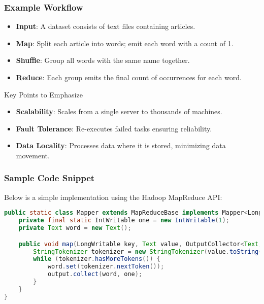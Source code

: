 \documentclass[aspectratio=169]{beamer}
\begin{document}
\begin{frame}
    \frametitle{Example Workflow}
    \begin{itemize}
        \item \textbf{Input}: A dataset consists of text files containing articles.
        \item \textbf{Map}: Split each article into words; emit each word with a count of 1.
        \item \textbf{Shuffle}: Group all words with the same name together.
        \item \textbf{Reduce}: Each group emits the final count of occurrences for each word.
    \end{itemize}

    \begin{block}{Key Points to Emphasize}
        \begin{itemize}
            \item \textbf{Scalability}: Scales from a single server to thousands of machines.
            \item \textbf{Fault Tolerance}: Re-executes failed tasks ensuring reliability.
            \item \textbf{Data Locality}: Processes data where it is stored, minimizing data movement.
        \end{itemize}
    \end{block}
\end{frame}

\begin{frame}[fragile]
    \frametitle{Sample Code Snippet}
    Below is a simple implementation using the Hadoop MapReduce API:
    \begin{lstlisting}[language=Java]
public static class Mapper extends MapReduceBase implements Mapper<LongWritable, Text, Text, IntWritable> {
    private final static IntWritable one = new IntWritable(1);
    private Text word = new Text();

    public void map(LongWritable key, Text value, OutputCollector<Text, IntWritable> output, Reporter reporter) throws IOException {
        StringTokenizer tokenizer = new StringTokenizer(value.toString());
        while (tokenizer.hasMoreTokens()) {
            word.set(tokenizer.nextToken());
            output.collect(word, one);
        }
    }
}
    \end{lstlisting}
\end{frame}
\end{document}
